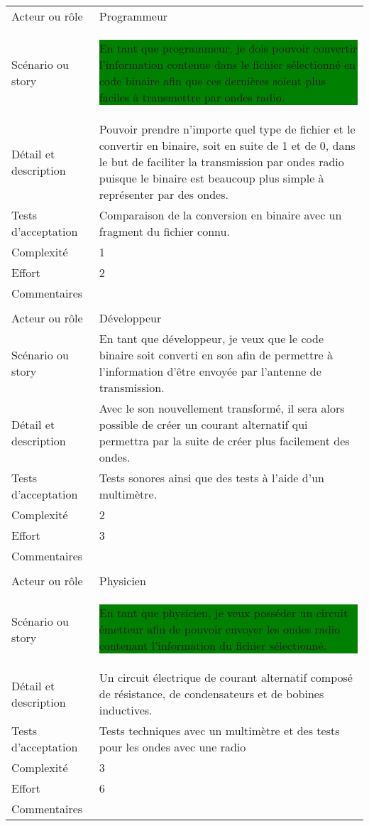 \begin{longtable}{|l|p{}|}
\hline
    \rowcolor{Gray}
    \multicolumn{2}{|l|}{3} \\
\hline
    Acteur ou rôle & Programmeur\\
\hline
    Scénario ou story &  \colorbox{Green}{\parbox{14.5cm}{En tant que programmeur,
          je dois pouvoir convertir l'information contenue 
          dans le fichier sélectionné en code binaire afin que ces 
          dernières soient plus faciles à transmettre par ondes radio.}} \\
\hline
    Détail et description & Pouvoir prendre n'importe quel type de fichier et le convertir en binaire, soit en suite de 1 et de 0, dans le but de faciliter la transmission par ondes radio puisque le binaire est beaucoup plus simple à représenter par des ondes.
        \\
\hline
    Tests d'acceptation & Comparaison de la conversion en binaire avec un fragment du fichier connu. \\

\hline
    Complexité & 1 \\
\hline
    Effort & 2 \\
\hline
    Commentaires &  \\

\hline
    \rowcolor{Gray}
    \multicolumn{2}{|l|}{4} \\
\hline
    Acteur ou rôle & Développeur \\
\hline
    Scénario ou story & En tant que développeur,
          je veux que le code binaire soit converti en son afin de permettre à l'information d'être envoyée par l'antenne de transmission. \\
\hline
    Détail et description & Avec le son nouvellement transformé, il sera alors possible de créer un courant alternatif qui permettra par la suite de créer plus facilement des ondes. \\
\hline
    Tests d'acceptation & Tests sonores ainsi que des tests à l'aide d'un multimètre. \\
\hline
    Complexité & 2 \\
\hline
    Effort & 3 \\
\hline
    Commentaires &  \\

\hline
    \rowcolor{Gray}
    \multicolumn{2}{|l|}{5} \\
\hline
    Acteur ou rôle & Physicien \\
\hline
    Scénario ou story &  \colorbox{Green}{\parbox{14.5cm}{En tant que physicien,
          je veux posséder un circuit émetteur afin de pouvoir envoyer les ondes radio contenant l'information du fichier sélectionné.}}\\
\hline
    Détail et description & Un circuit électrique de courant alternatif composé de résistance, de condensateurs et de bobines inductives. \\
\hline
    Tests d'acceptation & Tests techniques avec un multimètre et des tests pour les ondes avec une radio \\
\hline
    Complexité & 3 \\
\hline
    Effort & 6 \\
\hline
    Commentaires &  \\


\end{longtable}
